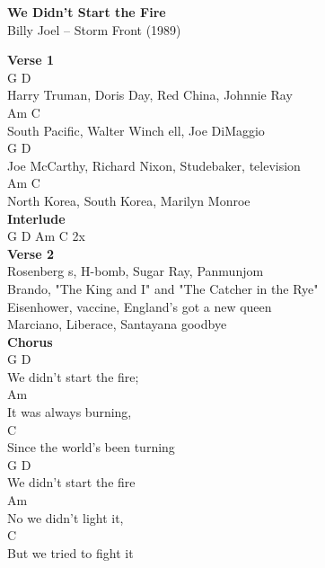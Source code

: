 \documentclass[a4paper]{article}
\begin{document}
    \begin{center}
        \textbf{We Didn't Start the Fire}
        ~\\
        Billy Joel -- Storm Front (1989)
    \end{center}
    {
        \scriptsize
        \textbf{Verse 1}
        ~\\
        {
            \cutive
            \obeyspaces
G                        D
\\
Harry Truman, Doris Day, Red China, Johnnie Ray
\\
Am                              C
\\
South Pacific, Walter Winch ell, Joe DiMaggio
\\
G                            D
\\
Joe McCarthy, Richard Nixon, Studebaker, television
\\
Am                        C
\\
North Korea, South Korea, Marilyn Monroe
\\

        }
        \textbf{Interlude}
        ~\\
        {
            \cutive
            \obeyspaces
G  D  Am  C  2x
\\

        }
        \textbf{Verse 2}
        ~\\
        {
            \cutive
            \obeyspaces
Rosenberg s, H-bomb, Sugar Ray, Panmunjom
\\
Brando, "The King and I" and "The Catcher in the Rye"
\\
Eisenhower, vaccine, England's got a new queen
\\
Marciano, Liberace, Santayana goodbye
\\

        }
        \textbf{Chorus}
        ~\\
        {
            \cutive
            \obeyspaces
G                   D
\\
We didn't start the fire;
\\
       Am
\\
It was always burning,
\\
          C
\\
Since the world's been turning
\\
G                   D
\\
We didn't start the fire
\\
      Am
\\
No we didn't light it,
\\
       C
\\
But we tried to fight it
\\

}}
\end{document}
